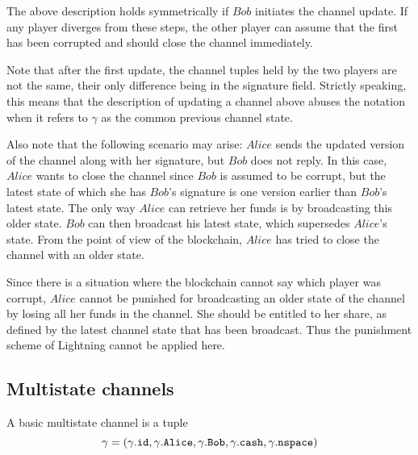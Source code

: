     The above description holds symmetrically if $Bob$ initiates the channel update. If
    any player diverges from these steps, the other player can assume that the first has
    been corrupted and should close the channel immediately.

    Note that after the first update, the channel tuples held by the two players are not
    the same, their only difference being in the signature field. Strictly speaking, this
    means that the description of updating a channel above abuses the notation when it
    refers to $\gamma$ as the common previous channel state.

    Also note that the following scenario may arise: $Alice$ sends the updated version of
    the channel along with her signature, but $Bob$ does not reply. In this case, $Alice$
    wants to close the channel since $Bob$ is assumed to be corrupt, but the latest state
    of which she has $Bob$'s signature is one version earlier than $Bob$'s latest state.
    The only way $Alice$ can retrieve her funds is by broadcasting this older state. $Bob$
    can then broadcast his latest state, which supersedes $Alice$'s state. From the point
    of view of the blockchain, $Alice$ has tried to close the channel with an older state.

    Since there is a situation where the blockchain cannot say which player was corrupt,
    $Alice$ cannot be punished for broadcasting an older state of the channel by losing
    all her funds in the channel. She should be entitled to her share, as defined by the
    latest channel state that has been broadcast. Thus the punishment scheme of Lightning
    cannot be applied here.

  \subsection{Multistate channels}
    A basic multistate channel is a tuple
    \begin{equation*}
      \gamma = \left(\gamma\mbox{.\texttt{id}}, \gamma\mbox{.\texttt{Alice}},
      \gamma\mbox{.\texttt{Bob}}, \gamma\mbox{.\texttt{cash}},
      \gamma\mbox{.\texttt{nspace}}\right)
    \end{equation*}
